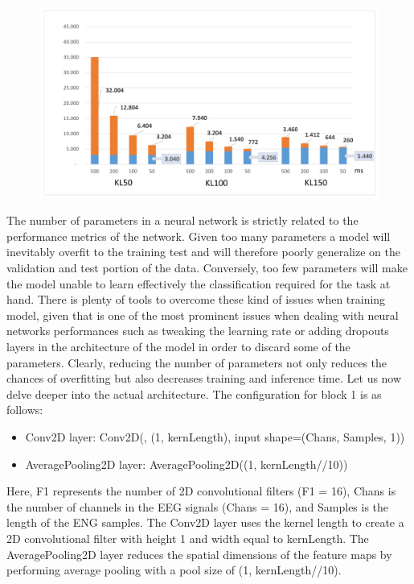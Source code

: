 \documentclass{Configuration_Files/PoliMi3i_thesis}
\begin{document}
\begin{figure}[H]
	\includegraphics[scale=0.3]{engNet_params.png}
	\centering
\end{figure}

The number of parameters in a neural network is strictly related to the performance metrics of the network.
Given too many parameters a model will inevitably overfit to the training test and will therefore poorly generalize on the validation and test portion of the data. Conversely, too few parameters will make the model unable to learn effectively the classification required for the task at hand.
There is plenty of tools to overcome these kind of issues when training model, given that is one of the most prominent issues when dealing with neural networks performances such as tweaking the learning rate or adding dropouts layers in the architecture of the model in order to discard some of the parameters.
Clearly, reducing the number of parameters not only reduces the chances of overfitting but also decreases training and inference time.
Let us now delve deeper into the actual architecture.
The configuration for block 1 is as follows:
\begin{itemize}
\item Conv2D layer: Conv2D(, (1, kernLength), input shape=(Chans, Samples, 1))
\item AveragePooling2D layer: AveragePooling2D((1, kernLength//10))
\end{itemize}

Here, F1 represents the number of 2D convolutional filters (F1 = 16), Chans is the number of channels in the EEG signals (Chans = 16), and Samples is the length of the ENG samples. The Conv2D layer uses the kernel length to create a 2D convolutional filter with height 1 and width equal to kernLength. The AveragePooling2D layer reduces the spatial dimensions of the feature maps by performing average pooling with a pool size of (1, kernLength//10).
\end{document}
